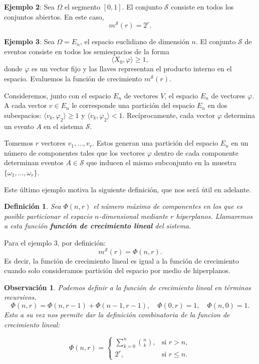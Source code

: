 \documentclass{report}
\newtheorem{dfn}{Definición}[section]
\newtheorem{obs}{Observación}[section]
\begin{document}
\textbf{Ejemplo 2}: Sea \( \Omega \) el segmento \([0,1]\). El conjunto \( \mathcal{S} \) 
consiste en todos los conjuntos abiertos. En este caso,  
\[
m^{\mathcal{S}}(r) = 2^r.
\]

\textbf{Ejemplo 3}: Sea \( \Omega = E_n \), el espacio euclidiano de dimensión \( n \). 
El conjunto \( \mathcal{S} \) de eventos consiste en todos los semiespacios de la forma  
\[
\langle X_0, \varphi \rangle \geq 1,
\]  
donde \( \varphi \) es un vector fijo y las llaves representan el producto interno en el espacio.
 Evaluemos la función de crecimiento \( m^{\mathcal{S}}(r) \).\newline

Consideremos, junto con el espacio \( E_n \) de vectores \( V \), el espacio \( E_n \) 
de vectores \( \varphi \). A cada vector \( v \in E_n \) le corresponde una partición 
del espacio \( E_n \) en dos subespacios: \(\langle v_k, \varphi_2 \rangle \geq 1\) y \(\langle v_k, \varphi_2 \rangle < 1\). 
Recíprocamente, cada vector \(\varphi\) determina un evento $A$ en el sistema \(\mathcal{S}\).\newline

Tomemos \( r \) vectores \( v_1, \dots, v_r \). Estos generan una partición del espacio \( E_n \) 
en un número de componentes tales que los vectores \( \varphi \) dentro de cada componente determinan eventos 
\( A \in \mathcal{S} \) que inducen el mismo subconjunto en la muestra \( \{\omega_1, \dots, \omega_r \}\).\newline

Este último ejemplo motiva la siguiente definición, que nos será útil en adelante.\newline

\begin{dfn}
    Sea \( \Phi(n, r) \) el número máximo de componentes en los que es posible particionar el espacio \( n \)-dimensional 
mediante \( r \) hiperplanos. Llamaremos a esta función \textbf{función de crecimiento lineal} del sistema.
\end{dfn}


Para el ejemplo 3, por definición:
\[
    m^{\mathcal{S}}(r) = \Phi(n, r).
\]
Es decir, la función de crecimiento lineal es igual a la función de crecimiento cuando solo consideramos partición
del espacio por medio de hiperplanos.

\begin{obs}
Podemos definir a la función de crecimiento lineal en términos recursivos. 
\[
    \Phi(n, r) = \Phi(n, r - 1) + \Phi(n - 1, r - 1),\quad \Phi(0, r) = 1, \quad \Phi(n, 0) = 1.
\]
Esto a su vez nos permite dar la definición combinatoria de la funcion de crecimiento lineal:

\begin{equation}
\Phi(n, r) =
\begin{cases}
\sum\limits_{k=0}^{n} \binom{n}{k}, & \text{si } r > n, \\
2^r, & \text{si } r \leq n.
\end{cases}
\label{def: combinatoria función crecimiento lineal}
\end{equation}
\end{obs}
\end{document}
